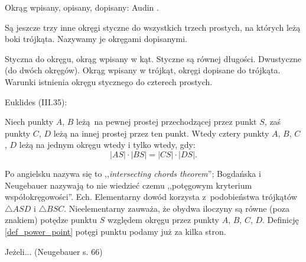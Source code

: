 
Okrąg wpisany, opisany, dopisany: Audin \cite[s. 98]{audin_2003}.

Są jeszcze trzy inne okręgi styczne do wszystkich trzech prostych, na których leżą boki trójkąta.
Nazywamy je okręgami dopisanymi.

Styczna do okręgu, okrąg wpisany w kąt.
Styczne są równej długości.
Dwustyczne (do dwóch okręgów).
Okrąg wpisany w trójkąt, okręgi dopisane do trójkąta.
Warunki istnienia okręgu stycznego do czterech prostych.

Euklides (III.35):

\begin{proposition}
    \label{prop_intersecting_chords}
	Niech punkty $A$, $B$ leżą na pewnej prostej przechodzącej przez punkt $S$, zaś punkty $C$, $D$ leżą na innej prostej przez ten punkt.
	Wtedy cztery punkty $A$, $B$, $C$, $D$ leżą na jednym okręgu wtedy i tylko wtedy, gdy:
	\begin{equation}
		|AS| \cdot |BS| = |CS| \cdot |DS|.
	\end{equation}
\end{proposition}

Po angielsku nazywa się to ,,\emph{intersecting chords theorem}''; Bogdańska i Neugebauer nazywają to nie wiedzieć czemu ,,potęgowym kryterium współokręgowości''.
Ech.
Elementarny dowód korzysta z~podobieństwa trójkątów $\triangle ASD$ i $\triangle BSC$.
Nieelementarny zauważa, że obydwa iloczyny są równe (poza znakiem) potędze punktu $S$ względem okręgu przez punkty $A$, $B$, $C$, $D$.
Definicję \ref{def_power_point} potęgi punktu podamy już za kilka stron.
%

\begin{proposition}
	Jeżeli... (Neugebauer s. 66)
\end{proposition}

